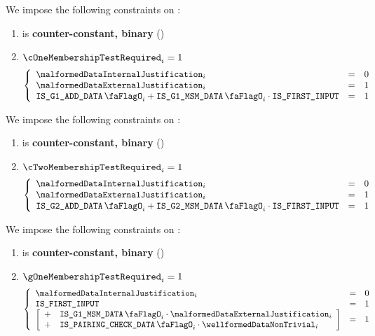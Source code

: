 We impose the following constraints on \cOneMembershipTestRequired{}:
\begin{enumerate}
    \item \cOneMembershipTestRequired{} is \textbf{counter-constant, binary} \quad (\trash)
    \item \If $\cOneMembershipTestRequired_{i} = 1$ \Then
        \[
            \left\{ \begin{array}{lcl}
                \malformedDataInternalJustification _{i} & = & 0 \\
                \malformedDataExternalJustification_{i}  & = & 1 \\
                \isBlsGOneAddData_{i} + \isBlsGOneMsmData_{i} \cdot \isFirstInput & = & 1 \\
            \end{array} \right.
        \]
\end{enumerate}
\noindent
We impose the following constraints on \cTwoMembershipTestRequired{}:
\begin{enumerate}
    \item \cTwoMembershipTestRequired{} is \textbf{counter-constant, binary} \quad (\trash)
    \item \If $\cTwoMembershipTestRequired_{i} = 1$ \Then
        \[
            \left\{ \begin{array}{lcl}
                \malformedDataInternalJustification _{i} & = & 0 \\
                \malformedDataExternalJustification _{i} & = & 1 \\
                \isBlsGTwoAddData_{i} + \isBlsGTwoMsmData_{i} \cdot \isFirstInput & = & 1 \\
            \end{array} \right.
        \]
\end{enumerate}
\noindent
We impose the following constraints on \gOneMembershipTestRequired{}:
\begin{enumerate}
    \item \gOneMembershipTestRequired{} is \textbf{counter-constant, binary} \quad (\trash)
    \item \If $\gOneMembershipTestRequired_{i} = 1$ \Then
        \[
            \left\{ \begin{array}{lcl}
                \malformedDataInternalJustification _{i} & = & 0 \\
                \isFirstInput & = & 1 \\
                \left[ \begin{array}{cl}
                    + & \isBlsGOneMsmData_{i} \cdot \malformedDataExternalJustification_{i}  \\
                    + & \isBlsPairingCheckData_{i} \cdot \wellformedDataNonTrivial_{i} \\
                \end{array} \right] & = & 1 \\
            \end{array} \right.
        \]
\end{enumerate}
